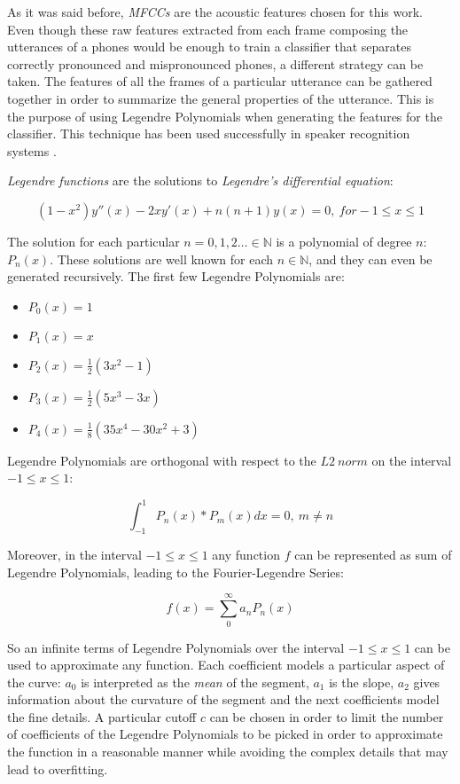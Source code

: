 As it was said before, \textit{MFCCs} are the acoustic features chosen for this work.
Even though these raw features extracted from each frame composing the utterances of a phones
would be enough to train a classifier that separates correctly
pronounced and mispronounced phones, a different strategy can be taken. The features of all the
frames of a particular utterance can be gathered together in order to summarize the
general properties of the utterance. This is the purpose of using Legendre Polynomials when
generating the features for the classifier. This technique has been used successfully
in speaker recognition systems \cite{legendre}.

\textit{Legendre functions} are the solutions to \textit{Legendre's differential equation}:

\begin{equation}
(1-x^{2})y''(x)-2xy'(x)+n(n+1)y(x)=0, \ for -1 \leq x \leq 1
\end{equation}

The solution for each particular $n={0, 1, 2 \dotsc} \in \mathbb{N}$ is a polynomial of degree
$n$: $P_{n}(x)$. These solutions are well known for each $n \in \mathbb{N}$, and they can even
be generated recursively. The first few Legendre Polynomials are:

\begin{itemize}
  \item[] $P_{0}(x) = 1$
  \item[] $P_{1}(x) = x$
  \item[] $P_{2}(x) = \frac{1}{2}(3x^{2} - 1)$
  \item[] $P_{3}(x) = \frac{1}{2}(5x^{3} - 3x)$
  \item[] $P_{4}(x) = \frac{1}{8}(35x^{4} - 30x^{2} + 3)$
\end{itemize}

Legendre Polynomials are orthogonal with respect to the $L2 \ norm$ on the interval \mbox{$-1 \leq x \leq 1$}:

\begin{equation}
\int_{-1}^{1} P_{n}(x)*P_{m}(x)dx = 0, \ m \neq n
\end{equation}

Moreover, in the interval \mbox{$-1 \leq x \leq 1$} any function $f$ can be represented as sum of
Legendre Polynomials, leading to the Fourier-Legendre Series:

\begin{equation}
f(x) = \sum_{0}^{\infty}a_{n}P_{n}(x)
\end{equation}

So an infinite terms of Legendre Polynomials over the interval \mbox{$-1 \leq x \leq 1$} can be used
to approximate any function. Each coefficient models a particular aspect of the curve: $a_{0}$
is interpreted as the \textit{mean} of the segment, $a_{1}$ is the slope, $a_{2}$ gives
information about the curvature of the segment and the next coefficients model the fine details.
A particular cutoff $c$ can be chosen in order to limit the number of coefficients of the
Legendre Polynomials to be picked in order to approximate the function in a reasonable manner
while avoiding the complex details that may lead to overfitting.